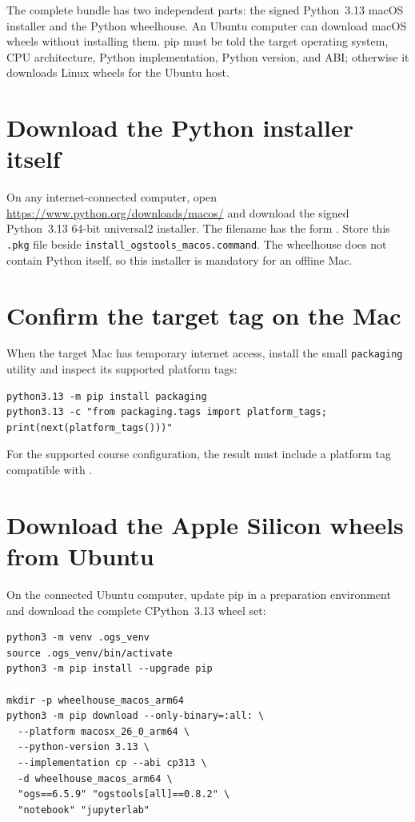 \documentclass[11pt,a4paper]{tubaf-report}
\begin{document}
The complete bundle has two independent parts: the signed Python~3.13 macOS
installer and the Python wheelhouse. An Ubuntu computer can download macOS
wheels without installing them. pip must be told the target operating system,
CPU architecture, Python implementation, Python version, and ABI; otherwise it
downloads Linux wheels for the Ubuntu host.

\section{Download the Python installer itself}

On any internet-connected computer, open
\url{https://www.python.org/downloads/macos/} and download the signed Python~3.13
64-bit universal2 installer. The filename has the form
. Store this \texttt{.pkg} file beside
\texttt{install\_ogstools\_macos.command}. The wheelhouse does not contain
Python itself, so this installer is mandatory for an offline Mac.

\section{Confirm the target tag on the Mac}

When the target Mac has temporary internet access, install the small
\texttt{packaging} utility and inspect its supported platform tags:

\begin{lstlisting}[style=terminal]
python3.13 -m pip install packaging
python3.13 -c "from packaging.tags import platform_tags; print(next(platform_tags()))"
\end{lstlisting}

For the supported course configuration, the result must include a platform tag
compatible with .

\section{Download the Apple Silicon wheels from Ubuntu}

On the connected Ubuntu computer, update pip in a preparation environment and
download the complete CPython~3.13 wheel set:

\begin{lstlisting}[style=terminal]
python3 -m venv .ogs_venv
source .ogs_venv/bin/activate
python3 -m pip install --upgrade pip

mkdir -p wheelhouse_macos_arm64
python3 -m pip download --only-binary=:all: \
  --platform macosx_26_0_arm64 \
  --python-version 3.13 \
  --implementation cp --abi cp313 \
  -d wheelhouse_macos_arm64 \
  "ogs==6.5.9" "ogstools[all]==0.8.2" \
  "notebook" "jupyterlab"
\end{lstlisting}
\end{document}
